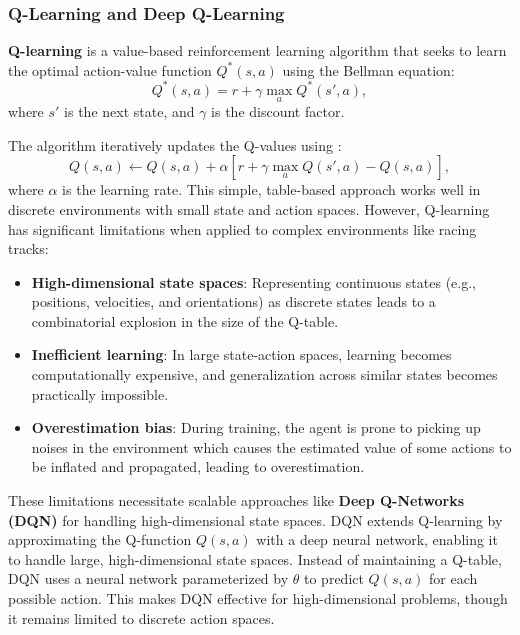 \documentclass{article}
\begin{document}


\subsubsection{Q-Learning and Deep Q-Learning} \label{sec:Q_deepQ_learn}

\textbf{Q-learning} \cite{watkins1989learning} is a value-based reinforcement learning algorithm that seeks to learn the optimal action-value function \(Q^*(s, a)\) using the Bellman equation:
\[
Q^*(s, a) = r + \gamma \max_a Q^*(s', a),
\]
where \(s'\) is the next state, and \(\gamma\) is the discount factor.

The algorithm iteratively updates the Q-values using \cite{sutton1998reinforcement}:
\[
Q(s, a) \leftarrow Q(s, a) + \alpha \left[ r + \gamma \max_a Q(s', a) - Q(s, a) \right],
\]
where \(\alpha\) is the learning rate. This simple, table-based approach works well in discrete environments with small state and action spaces. However, Q-learning has significant limitations when applied to complex environments like racing tracks:

\begin{itemize}
	\item \textbf{High-dimensional state spaces}: Representing continuous states (e.g., positions, velocities, and orientations) as discrete states leads to a combinatorial explosion in the size of the Q-table.
	\item \textbf{Inefficient learning}: In large state-action spaces, learning becomes computationally expensive, and generalization across similar states becomes practically impossible.
	\item \textbf{Overestimation bias}: During training, the agent is prone to picking up noises in the environment which causes the estimated value of some actions to be inflated and propagated, leading to overestimation.
\end{itemize}

These limitations necessitate scalable approaches like \textbf{Deep Q-Networks (DQN)} \cite{mnih2015human} for handling high-dimensional state spaces.
DQN extends Q-learning by approximating the Q-function \(Q(s, a)\) with a deep neural network, enabling it to handle large, high-dimensional state spaces.
Instead of maintaining a Q-table, DQN uses a neural network parameterized by \(\theta\) to predict \(Q(s, a)\) for each possible action. This makes DQN effective for high-dimensional problems, though it remains limited to discrete action spaces.
\end{document}
